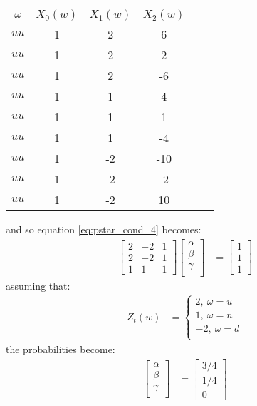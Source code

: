 \documentclass{article}
\begin{document}
\begin{center}
\begin{tabular}{|c|c|c|c|c|c|}
\hline
$\omega$ & $X_0(w)$ & $X_1(w)$ & $X_2(w)$ \\
\hline
\hline
$uu$ & 1 & 2 & 6 \\\hline
$uu$ & 1 & 2 & 2 \\\hline
$uu$ & 1 & 2 & -6 \\\hline
$uu$ & 1 & 1 & 4 \\\hline
$uu$ & 1 & 1 & 1 \\\hline
$uu$ & 1 & 1 & -4 \\\hline
$uu$ & 1 & -2 & -10 \\\hline
$uu$ & 1 & -2 & -2 \\\hline
$uu$ & 1 & -2 & 10 \\\hline
\end{tabular}
\end{center}
and so equation \ref{eq:pstar_cond_4} becomes:
\begin{align}
\left[\begin{array}{cccc}
2 & -2 & 1\\
2 & -2 & 1\\
1 & 1 & 1
\end{array} \right]
\left[\begin{array}{c}
\alpha\\
\beta\\
\gamma\\
\end{array} \right] &= \left[\begin{array}{c}
1\\
1\\
1
\end{array} \right]
\end{align}
assuming that:
\begin{align*}
Z_t(w) &= \begin{cases}
    2, \medspace \omega=u \\
    1, \medspace \omega=n \\
    -2, \medspace \omega=d \\
\end{cases}
\end{align*}
the probabilities become:
\begin{align}
\left[\begin{array}{c}
\alpha\\
\beta\\
\gamma\\
\end{array} \right] &= \left[\begin{array}{c}
3/4\\
1/4\\
0
\end{array} \right]
\end{align}
\end{document}
